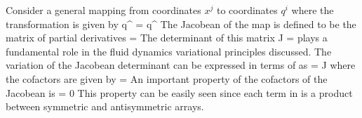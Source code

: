 \documentclass[12pt]{article}
\begin{document}
Consider a general mapping from coordinates $x^j$ to coordinates $q^i$ where the transformation
is given by
\bes
    q^{\gbm} = q^{\gbm}  \eqp
\ees
The Jacobean of the map is defined to be the matrix of partial derivatives
\bes
  \Jac{\gbm}{\gn} =  \eqp
\ees
The determinant of this matrix
\bes
   J \equiv \det{\Jac{\gbm}{\gn}} = 
\ees
plays a fundamental role in the fluid dynamics variational principles discussed.
The variation of the Jacobean determinant can be expressed in
terms of  as
\be\label{eq:D5}
   = J \push {} \Jac{\gbm}{\gn} \eqp
\ee
where the cofactors  are given by
\be\label{eq:D6}
 =  
                         
                        \cdots {} \eqp
\ee
An important property of the cofactors of the Jacobean is
\be\label{eq:D7}
  = 0 \eqp
\ee
This property can be easily seen since each term in 
\bes
     
                            \cdots
                          \cdots
                          \eqc
\ees
is a product between symmetric and antisymmetric arrays.
\end{document}

